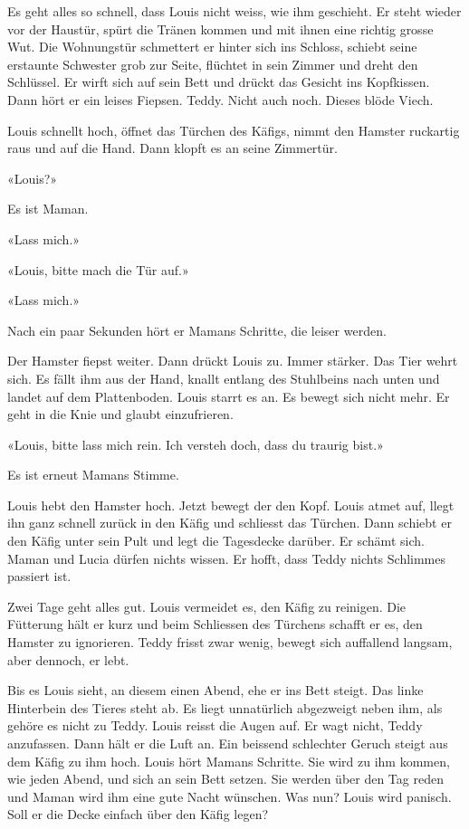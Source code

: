 Es geht alles so schnell, dass Louis nicht weiss, wie ihm geschieht. Er
steht wieder vor der Haustür, spürt die Tränen kommen und mit ihnen eine
richtig grosse Wut. Die Wohnungstür schmettert er hinter sich ins
Schloss, schiebt seine erstaunte Schwester grob zur Seite, flüchtet in
sein Zimmer und dreht den Schlüssel. Er wirft sich auf sein Bett und
drückt das Gesicht ins Kopfkissen. Dann hört er ein leises Fiepsen.
Teddy. Nicht auch noch. Dieses blöde Viech.

Louis schnellt hoch, öffnet das Türchen des Käfigs, nimmt den Hamster
ruckartig raus und auf die Hand. Dann klopft es an seine Zimmertür.

«Louis?»

Es ist Maman.

«Lass mich.»

«Louis, bitte mach die Tür auf.»

«Lass mich.»

Nach ein paar Sekunden hört er Mamans Schritte, die leiser werden.

Der Hamster fiepst weiter. Dann drückt Louis zu. Immer stärker. Das Tier
wehrt sich. Es fällt ihm aus der Hand, knallt entlang des Stuhlbeins
nach unten und landet auf dem Plattenboden. Louis starrt es an. Es
bewegt sich nicht mehr. Er geht in die Knie und glaubt einzufrieren.

«Louis, bitte lass mich rein. Ich versteh doch, dass du traurig bist.»

Es ist erneut Mamans Stimme.

Louis hebt den Hamster hoch. Jetzt bewegt der den Kopf. Louis atmet auf,
llegt ihn ganz schnell zurück in den Käfig und schliesst das Türchen.
Dann schiebt er den Käfig unter sein Pult und legt die Tagesdecke
darüber. Er schämt sich. Maman und Lucia dürfen nichts wissen. Er hofft,
dass Teddy nichts Schlimmes passiert ist.

Zwei Tage geht alles gut. Louis vermeidet es, den Käfig zu reinigen. Die
Fütterung hält er kurz und beim Schliessen des Türchens schafft er es,
den Hamster zu ignorieren. Teddy frisst zwar wenig, bewegt sich
auffallend langsam, aber dennoch, er lebt.

Bis es Louis sieht, an diesem einen Abend, ehe er ins Bett steigt. Das
linke Hinterbein des Tieres steht ab. Es liegt unnatürlich abgezweigt
neben ihm, als gehöre es nicht zu Teddy. Louis reisst die Augen auf. Er
wagt nicht, Teddy anzufassen. Dann hält er die Luft an. Ein beissend
schlechter Geruch steigt aus dem Käfig zu ihm hoch. Louis hört Mamans
Schritte. Sie wird zu ihm kommen, wie jeden Abend, und sich an sein Bett
setzen. Sie werden über den Tag reden und Maman wird ihm eine gute Nacht
wünschen. Was nun? Louis wird panisch. Soll er die Decke einfach über
den Käfig legen?

